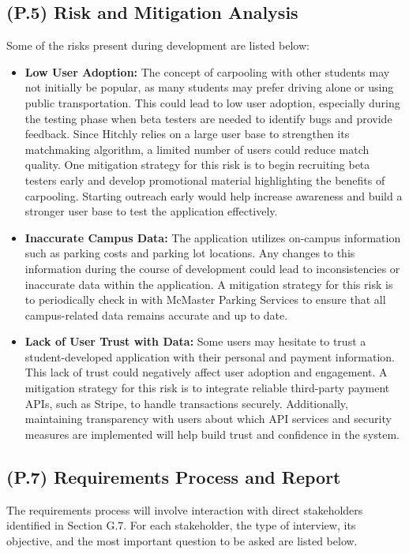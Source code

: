 \documentclass[12pt,letterpaper]{article}
\begin{document}
\subsection{(P.5) Risk and Mitigation Analysis}
Some of the risks present during development are listed below:

\begin{itemize}
    \item \textbf{Low User Adoption:} The concept of carpooling with other students may not initially be popular, as many students may prefer driving alone or using public transportation. This could lead to low user adoption, especially during the testing phase when beta testers are needed to identify bugs and provide feedback. Since Hitchly relies on a large user base to strengthen its matchmaking algorithm, a limited number of users could reduce match quality. One mitigation strategy for this risk is to begin recruiting beta testers early and develop promotional material highlighting the benefits of carpooling. Starting outreach early would help increase awareness and build a stronger user base to test the application effectively.

    \item \textbf{Inaccurate Campus Data:} The application utilizes on-campus information such as parking costs and parking lot locations. Any changes to this information during the course of development could lead to inconsistencies or inaccurate data within the application. A mitigation strategy for this risk is to periodically check in with McMaster Parking Services to ensure that all campus-related data remains accurate and up to date.

    \item \textbf{Lack of User Trust with Data:} Some users may hesitate to trust a student-developed application with their personal and payment information. This lack of trust could negatively affect user adoption and engagement. A mitigation strategy for this risk is to integrate reliable third-party payment APIs, such as Stripe, to handle transactions securely. Additionally, maintaining transparency with users about which API services and security measures are implemented will help build trust and confidence in the system.
\end{itemize}

\subsection{(P.7) Requirements Process and Report}
The requirements process will involve interaction with direct stakeholders identified in Section G.7.  
For each stakeholder, the type of interview, its objective, and the most important question to be asked are listed below.
\end{document}
